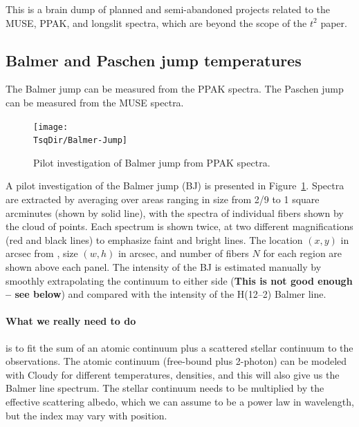 \documentclass[preprint]{aastex}
\newcommand\TsqDir{/Users/will/Work/RubinWFC3/Tsquared}
\begin{document}
This is a brain dump of planned and semi-abandoned projects related to
the MUSE, PPAK, and longslit spectra, which are beyond the scope of
the $t^2$ paper. 

\subsection{Balmer and Paschen jump temperatures}
\label{sec:balmer-paschen-jump}

The Balmer jump can be measured from the PPAK spectra.  The Paschen
jump can be measured from the MUSE spectra. 

\begin{figure}
  \texttt{[image: \\TsqDir/Balmer-Jump]}
  \caption{Pilot investigation of Balmer jump from PPAK spectra.}
  \label{fig:balmer-jump-ppak}
\end{figure}

A pilot investigation of the Balmer jump (BJ) is presented in
Figure~\ref{fig:balmer-jump-ppak}.  Spectra are extracted by averaging
over areas ranging in size from 2/9 to 1 square arcminutes (shown by
solid line), with the spectra of individual fibers shown by the cloud
of points.  Each spectrum is shown twice, at two different
magnifications (red and black lines) to emphasize faint and bright
lines.  The location \((x, y)\) in arcsec from , size \((w,
h)\) in arcsec, and number of fibers \(N\) for each region are shown
above each panel.  The intensity of the BJ is estimated manually by
smoothly extrapolating the continuum to either side (\textbf{This is
  not good enough -- see below}) and compared with the intensity of
the H(12--2) Balmer line. 

\paragraph{What we really need to do} is to fit the sum of an atomic
continuum plus a scattered stellar continuum to the observations.  The
atomic continuum (free-bound plus 2-photon) can be modeled with Cloudy
for different temperatures, densities, and this will also give us the
Balmer line spectrum.  The stellar continuum needs to be multiplied by
the effective scattering albedo, which we can assume to be a power law
in wavelength, but the index may vary with position. 
\end{document}
